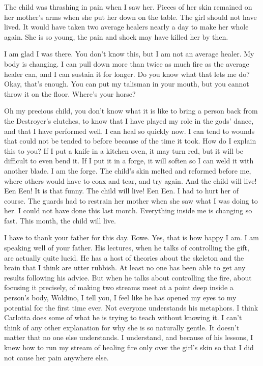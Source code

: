 \documentclass{article}
\begin{document}
The child was thrashing in pain when I saw her. Pieces of her skin remained on her mother's arms when she put her down on the table. The girl should not have lived. It would have taken two average healers nearly a day to make her whole again. She is so young, the pain and shock may have killed her by then.

I am glad I was there. You don't know this, but I am not an average healer. My body is changing. I can pull down more than twice as much fire as the average healer can, and I can sustain it for longer. Do you know what that lets me do? Okay, that's enough. You can put my talisman in your mouth, but you cannot throw it on the floor. Where's your horse?

Oh my precious child, you don't know what it is like to bring a person back from the Destroyer's clutches, to know that I have played my role in the gods' dance, and that I have performed well. I can heal so quickly now. I can tend to wounds that could not be tended to before because of the time it took. How do I explain this to you? If I put a knife in a kitchen oven, it may turn red, but it will be difficult to even bend it. If I put it in a forge, it will soften so I can weld it with another blade. I am the forge. The child's skin melted and reformed before me, where others would have to coax and tear, and try again. And the child will live! Een Een! It is that funny. The child will live! Een Een. I had to hurt her of course. The guards had to restrain her mother when she saw what I was doing to her. I could not have done this last month. Everything inside me is changing so fast. This month, the child will live.

I have to thank your father for this day. Eowe. Yes, that is how happy I am. I am speaking well of your father. His lectures, when he talks of controlling the gift, are actually quite lucid. He has a host of theories about the skeleton and the brain that I think are utter rubbish. At least no one has been able to get any results following his advice. But when he talks about controlling the fire, about focusing it precisely, of making two streams meet at a point deep inside a person's body, Woldino, I tell you, I feel like he has opened my eyes to my potential for the first time ever. Not everyone understands his metaphors. I think Carlotta does some of what he is trying to teach without knowing it. I can't think of any other explanation for why she is so naturally gentle. It doesn't matter that no one else understands. I understand, and because of his lessons, I knew how to run my stream of healing fire only over the girl's skin so that I did not cause her pain anywhere else. 
\end{document}
